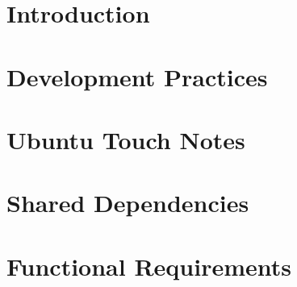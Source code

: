 



\chapter{Introduction}








\chapter{Development Practices}







\chapter{Ubuntu Touch Notes}








\chapter{Shared Dependencies}





\newpage


\chapter{Functional Requirements}


